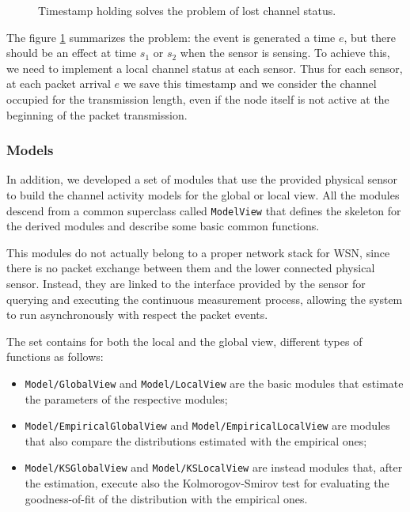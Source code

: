 \begin{figure}[htb]
	\begin{center}
		\scalebox{0.75}{}
	\end{center}
	\caption{Timestamp holding solves the problem of lost channel status.}
	\label{fig:ns_memory}
\end{figure}

The figure \ref{fig:ns_memory} summarizes the problem: the event is generated a time $e$, but there should be an effect at time $s_1$ or $s_2$ when the sensor is sensing. To achieve this, we need to implement a local channel status at each sensor. Thus for each sensor, at each packet arrival $e$ we save this timestamp and we consider the channel occupied for the transmission length, even if the node itself is not active at the beginning of the packet transmission.

\subsubsection{Models}

In addition, we developed a set of modules that use the provided physical sensor to build the channel activity models for the global or local view. All the modules descend from a common superclass called \texttt{ModelView} that defines the skeleton for the derived modules and describe some basic common functions.

This modules do not actually belong to a proper network stack for \ac{WSN}, since there is no packet exchange between them and the lower connected physical sensor. Instead, they are linked to the interface provided by the sensor for querying and executing the continuous measurement process, allowing the system to run asynchronously with respect the packet events.

The set contains for both the local and the global view, different types of functions as follows:
\begin{itemize}
	\item \texttt{Model/GlobalView} and \texttt{Model/LocalView} are the basic modules that estimate the parameters of the respective modules;
	\item \texttt{Model/EmpiricalGlobalView} and \texttt{Model/EmpiricalLocalView} are modules that also compare the distributions estimated with the empirical ones;
	\item \texttt{Model/KSGlobalView} and \texttt{Model/KSLocalView} are instead modules that, after the estimation, execute also the Kolmorogov-Smirov test \cite{Massey1951} for evaluating the goodness-of-fit of the distribution with the empirical ones.
\end{itemize}

